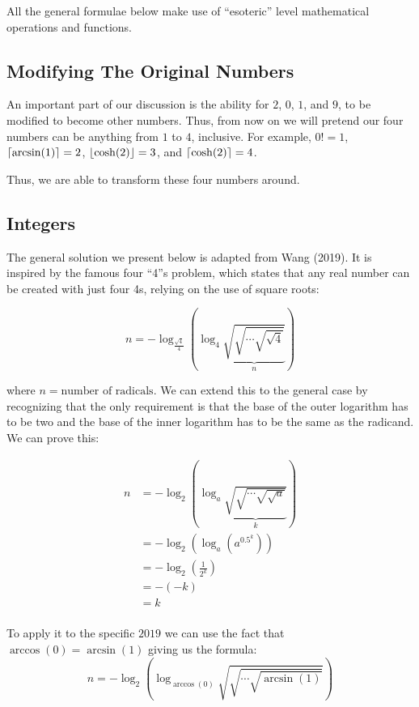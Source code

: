 All the general formulae below make use of ``esoteric'' level mathematical operations and functions.

\subsection{Modifying The Original Numbers}

An important part of our discussion is the ability for $2$, $0$, $1$, and $9$, to be modified to become other numbers. Thus, from now on we will pretend our four numbers can be anything from $1$ to $4$, inclusive. For example, $0! = 1$, $\lceil\arcsin(1)\rceil=2$, $\lfloor\cosh(2)\rfloor=3$, and $\lceil\cosh(2)\rceil=4$.

Thus, we are able to transform these four numbers around.

\subsection{Integers}

The general solution we present below is adapted from Wang (2019).
It is inspired by the famous four ``4''s  problem, which states that any real number can be created with just four 4s, relying on the use of square roots:

\begin{equation}
    n = -\log_\frac{\sqrt{4}}{4}\left( \log_4 \underbrace{\sqrt{\sqrt{\cdots\sqrt{\sqrt{4}}}}}_{n} \right)
\end{equation}

where $n=\textrm{number of radicals}$. We can extend this to the general case by recognizing that the only requirement is that the base of the outer logarithm has to be two and the base of the inner logarithm has to be the same as the radicand. We can prove this:

\begin{align*}
    n &= -\log_2\left(\log_a \underbrace{\sqrt{\sqrt{\cdots\sqrt{\sqrt{a}}}}}_{k} \right) \\
    &= -\log_2\left(\log_a \left(a^{0.5^k}\right)\right) \\
    &= -\log_2\left(\frac{1}{2^k}\right) \\
    &= -(-k) \\
    &= k \\
\end{align*}

To apply it to the specific $2019$ we can use the fact that $\arccos(0) = \arcsin(1)$ giving us the formula:
\begin{equation}
    n = -\log_2\left( \log_{\arccos(0)} \sqrt{\sqrt{\cdots\sqrt{\arcsin(1)}}}\right)
\end{equation}


